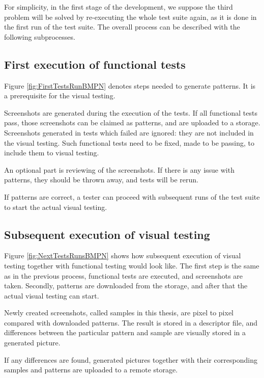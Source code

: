 \documentclass[11pt,oneside,final]{fithesis2}
\begin{document}
  For simplicity, in the first stage of the development, we suppose the third problem will be solved by re-executing the whole test suite
  again, as it is done in the first run of the test suite. The overall process can be described with the following subprocesses.
  
  \subsection{First execution of functional tests}
  \label{chap:firstRunProc}
  
  Figure \ref{fig:FirstTestsRunBMPN} denotes steps needed to generate patterns. It is a prerequisite for the visual testing.
  
  Screenshots are generated during the execution of the tests. If all functional tests pass, those screenshots
  can be claimed as patterns, and are uploaded to a storage. Screenshots generated in tests which failed are ignored: they are
  not included in the visual testing. Such functional tests need to be fixed, made to be passing, to include them to visual testing.
  
  An optional part is reviewing of the screenshots. If there is any issue with patterns, they should be thrown away, and tests will be rerun.
  
  If patterns are correct, a tester can proceed with subsequent runs of the test suite to start the actual visual testing.
  
  \subsection{Subsequent execution of visual testing}
  
  Figure \ref{fig:NextTestsRunsBMPN} shows how subsequent execution of visual testing together with functional testing would look like. The first step is the same as in the previous process,
  functional tests are executed, and screenshots are taken. Secondly, patterns are downloaded from the storage, and after that the actual visual testing can start.
  
  Newly created screenshots, called samples in this thesis, are pixel to pixel compared with downloaded patterns. The result is stored in a descriptor file, and differences between the 
  particular pattern and sample are visually stored in a generated picture.
  
  If any differences are found, generated pictures together with their corresponding samples and patterns are uploaded to a remote storage.
  
\end{document}
